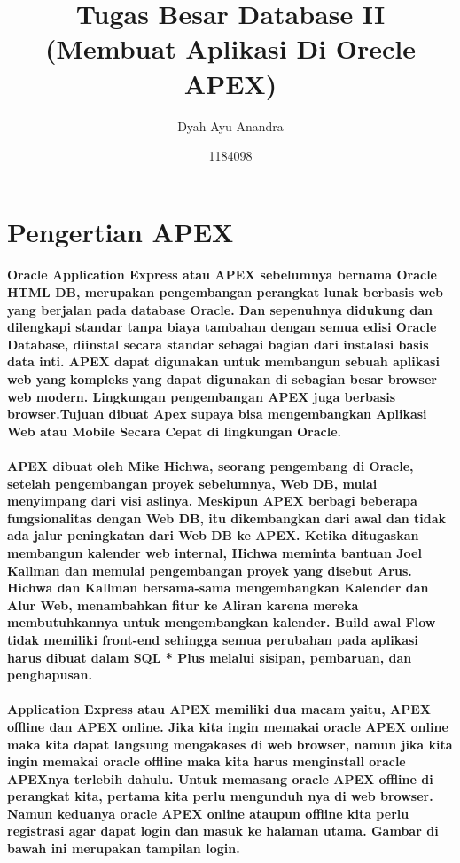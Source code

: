 \documentclass{article}
\title{Tugas Besar Database II (Membuat Aplikasi Di Orecle APEX)}
\author{Dyah Ayu Anandra}
\date{1184098}
\begin{document}
\maketitle

\section{Pengertian APEX}
\hspace \paragraph{Oracle Application Express atau APEX sebelumnya bernama Oracle HTML DB, merupakan pengembangan perangkat lunak berbasis web yang berjalan pada database Oracle. Dan sepenuhnya didukung dan dilengkapi standar tanpa biaya tambahan dengan semua edisi Oracle Database, diinstal secara standar sebagai bagian dari instalasi basis data inti. APEX dapat digunakan untuk membangun sebuah aplikasi web yang kompleks yang dapat digunakan di sebagian besar browser web modern. Lingkungan pengembangan APEX juga berbasis browser.Tujuan dibuat Apex supaya bisa mengembangkan Aplikasi Web atau Mobile Secara Cepat di lingkungan Oracle.}
\hspace \paragraph{APEX dibuat oleh Mike Hichwa, seorang pengembang di Oracle, setelah pengembangan proyek sebelumnya, Web DB, mulai menyimpang dari visi aslinya. Meskipun APEX berbagi beberapa fungsionalitas dengan Web DB, itu dikembangkan dari awal dan tidak ada jalur peningkatan dari Web DB ke APEX. Ketika ditugaskan membangun kalender web internal, Hichwa meminta bantuan Joel Kallman dan memulai pengembangan proyek yang disebut Arus. Hichwa dan Kallman bersama-sama mengembangkan Kalender dan Alur Web, menambahkan fitur ke Aliran karena mereka membutuhkannya untuk mengembangkan kalender. Build awal Flow tidak memiliki front-end sehingga semua perubahan pada aplikasi harus dibuat dalam SQL * Plus melalui sisipan, pembaruan, dan penghapusan.}

\hspace \paragraph{Application Express atau APEX memiliki dua macam yaitu, APEX offline dan APEX online. Jika kita ingin memakai oracle APEX online maka kita dapat langsung mengakases di web browser, namun jika kita ingin memakai oracle offline maka kita harus menginstall oracle APEXnya terlebih dahulu. Untuk memasang oracle APEX offline di perangkat kita, pertama kita perlu mengunduh nya di web browser. Namun keduanya oracle APEX online ataupun offline kita perlu registrasi agar dapat login dan masuk ke halaman utama. Gambar di bawah ini merupakan tampilan login.}
\end{document}
